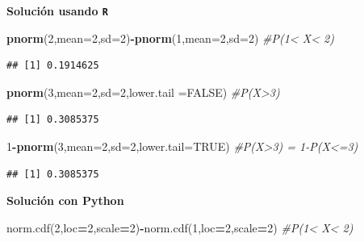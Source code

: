 \documentclass[]{book}
\newenvironment{Shaded}{\begin{snugshade}}{\end{snugshade}}
\newcommand{\CommentTok}[1]{\textcolor[rgb]{0.56,0.35,0.01}{\textit{#1}}}
\newcommand{\DataTypeTok}[1]{\textcolor[rgb]{0.13,0.29,0.53}{#1}}
\newcommand{\DecValTok}[1]{\textcolor[rgb]{0.00,0.00,0.81}{#1}}
\newcommand{\KeywordTok}[1]{\textcolor[rgb]{0.13,0.29,0.53}{\textbf{#1}}}
\newcommand{\NormalTok}[1]{#1}
\newcommand{\OperatorTok}[1]{\textcolor[rgb]{0.81,0.36,0.00}{\textbf{#1}}}
\newcommand{\OtherTok}[1]{\textcolor[rgb]{0.56,0.35,0.01}{#1}}
\begin{document}
\textbf{Solución usando \texttt{R}}

\begin{Shaded}
\begin{Highlighting}[]
\KeywordTok{pnorm}\NormalTok{(}\DecValTok{2}\NormalTok{,}\DataTypeTok{mean=}\DecValTok{2}\NormalTok{,}\DataTypeTok{sd=}\DecValTok{2}\NormalTok{)}\OperatorTok{-}\KeywordTok{pnorm}\NormalTok{(}\DecValTok{1}\NormalTok{,}\DataTypeTok{mean=}\DecValTok{2}\NormalTok{,}\DataTypeTok{sd=}\DecValTok{2}\NormalTok{) }\CommentTok{#P(1< X< 2)}
\end{Highlighting}
\end{Shaded}

\begin{verbatim}
## [1] 0.1914625
\end{verbatim}

\begin{Shaded}
\begin{Highlighting}[]
\KeywordTok{pnorm}\NormalTok{(}\DecValTok{3}\NormalTok{,}\DataTypeTok{mean=}\DecValTok{2}\NormalTok{,}\DataTypeTok{sd=}\DecValTok{2}\NormalTok{,}\DataTypeTok{lower.tail =}\OtherTok{FALSE}\NormalTok{) }\CommentTok{#P(X>3)}
\end{Highlighting}
\end{Shaded}

\begin{verbatim}
## [1] 0.3085375
\end{verbatim}

\begin{Shaded}
\begin{Highlighting}[]
\DecValTok{1}\OperatorTok{-}\KeywordTok{pnorm}\NormalTok{(}\DecValTok{3}\NormalTok{,}\DataTypeTok{mean=}\DecValTok{2}\NormalTok{,}\DataTypeTok{sd=}\DecValTok{2}\NormalTok{,}\DataTypeTok{lower.tail=}\OtherTok{TRUE}\NormalTok{) }\CommentTok{#P(X>3) = 1-P(X<=3)}
\end{Highlighting}
\end{Shaded}

\begin{verbatim}
## [1] 0.3085375
\end{verbatim}

\textbf{Solución con Python}

\begin{Shaded}
\begin{Highlighting}[]
\NormalTok{norm.cdf(}\DecValTok{2}\NormalTok{,loc}\OperatorTok{=}\DecValTok{2}\NormalTok{,scale}\OperatorTok{=}\DecValTok{2}\NormalTok{)}\OperatorTok{-}\NormalTok{norm.cdf(}\DecValTok{1}\NormalTok{,loc}\OperatorTok{=}\DecValTok{2}\NormalTok{,scale}\OperatorTok{=}\DecValTok{2}\NormalTok{) }\CommentTok{#P(1< X< 2)}
\end{Highlighting}
\end{Shaded}
\end{document}

